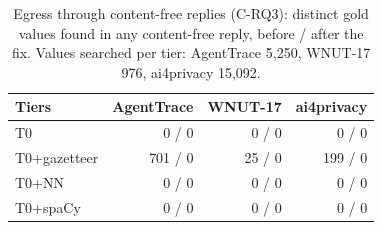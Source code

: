 \begin{table}[t]
\caption{Egress through content-free replies (C-RQ3): distinct gold values found in any content-free reply, before / after the fix. Values searched per tier: AgentTrace 5,250, WNUT-17 976, ai4privacy 15,092.}\label{tab:egress}
\centering\footnotesize
\begin{tabular}{@{}l r r r@{}}
\toprule
Tiers & AgentTrace & WNUT-17 & ai4privacy \\
\midrule
T0 & 0 / 0 & 0 / 0 & 0 / 0 \\
T0+gazetteer & 701 / 0 & 25 / 0 & 199 / 0 \\
T0+NN & 0 / 0 & 0 / 0 & 0 / 0 \\
T0+spaCy & 0 / 0 & 0 / 0 & 0 / 0 \\
\bottomrule
\end{tabular}
\end{table}
